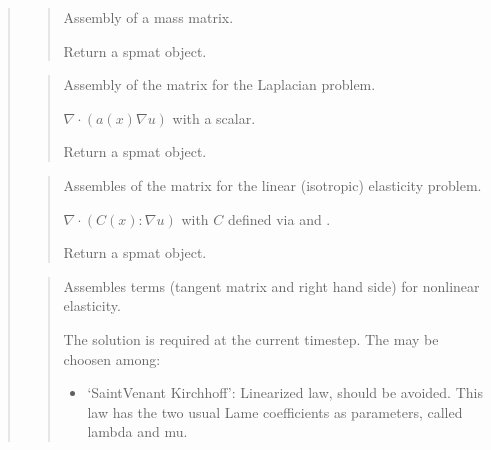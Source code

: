 \documentclass[a4paper,11pt,english]{sphinxmanual}
\begin{document}
\begin{quote}
\begin{quote}

Assembly of a mass matrix.

Return a spmat object.
\end{quote}

\begin{quote}

Assembly of the matrix for the Laplacian problem.

\(\nabla\cdot(a(x)\nabla u)\)  with  a scalar.

Return a spmat object.
\end{quote}

\begin{quote}

Assembles of the matrix for the linear (isotropic) elasticity problem.

\(\nabla\cdot(C(x):\nabla u)\)
with \(C\) defined via  and .

Return a spmat object.
\end{quote}

\begin{quote}

Assembles terms (tangent matrix and right hand side) for nonlinear elasticity.

The solution  is required at the current time\sphinxhyphen{}step. The 
may be choosen among:
\begin{itemize}
\item {} 
‘SaintVenant Kirchhoff’:
Linearized law, should be avoided. This law has the two usual
Lame coefficients as parameters, called lambda and mu.


\end{itemize}
\end{quote}
\end{quote}
\end{document}
